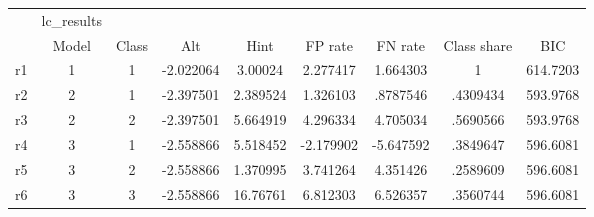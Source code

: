\begin{tabular}{l*{8}{c}}
\hline\hline
            &  lc\_results&            &            &            &            &            &            &            \\
            &       Model&       Class&         Alt&        Hint&     FP rate&     FN rate& Class share&         BIC\\
\hline
r1          &           1&           1&   -2.022064&     3.00024&    2.277417&    1.664303&           1&    614.7203\\
r2          &           2&           1&   -2.397501&    2.389524&    1.326103&    .8787546&    .4309434&    593.9768\\
r3          &           2&           2&   -2.397501&    5.664919&    4.296334&    4.705034&    .5690566&    593.9768\\
r4          &           3&           1&   -2.558866&    5.518452&   -2.179902&   -5.647592&    .3849647&    596.6081\\
r5          &           3&           2&   -2.558866&    1.370995&    3.741264&    4.351426&    .2589609&    596.6081\\
r6          &           3&           3&   -2.558866&    16.76761&    6.812303&    6.526357&    .3560744&    596.6081\\
\hline\hline
\end{tabular}
